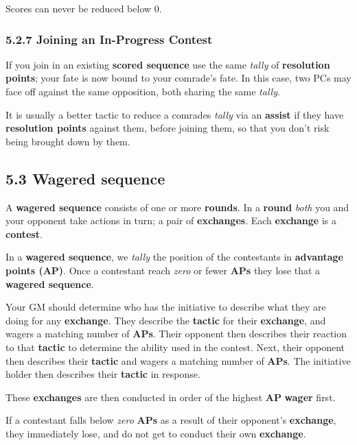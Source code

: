 \documentclass[
  11pt,
]{article}
\begin{document}
Scores can never be reduced below 0.

\hypertarget{joining-an-in-progress-contest-1}{%
\subsubsection{5.2.7 Joining an In-Progress
Contest}\label{joining-an-in-progress-contest-1}}

If you join in an existing \textbf{scored sequence} use the same
\emph{tally} of \textbf{resolution points}; your fate is now bound to
your comrade's fate. In this case, two PCs may face off against the same
opposition, both sharing the same \emph{tally}.

It is usually a better tactic to reduce a comrades \emph{tally} via an
\textbf{assist} if they have \textbf{resolution points} against them,
before joining them, so that you don't risk being brought down by them.

\hypertarget{wagered-sequence}{%
\subsection{5.3 Wagered sequence}\label{wagered-sequence}}

A \textbf{wagered sequence} consists of one or more \textbf{rounds}. In
a \textbf{round} \emph{both} you and your opponent take actions in turn;
a pair of \textbf{exchanges}. Each \textbf{exchange} is a
\textbf{contest}.

In a \textbf{wagered sequence}, we \emph{tally} the position of the
contestants in \textbf{advantage points (AP)}. Once a contestant reach
\emph{zero} or fewer \textbf{APs} they lose that a \textbf{wagered
sequence}.

Your GM should determine who has the initiative to describe what they
are doing for any \textbf{exchange}. They describe the \textbf{tactic}
for their \textbf{exchange}, and wagers a matching number of
\textbf{APs}. Their opponent then describes their reaction to that
\textbf{tactic} to determine the ability used in the contest. Next,
their opponent then describes their \textbf{tactic} and wagers a
matching number of \textbf{APs}. The initiative holder then describes
their \textbf{tactic} in response.

These \textbf{exchanges} are then conducted in order of the highest
\textbf{AP} \textbf{wager} first.

If a contestant falls below \emph{zero} \textbf{APs} as a result of
their opponent's \textbf{exchange}, they immediately lose, and do not
get to conduct their own \textbf{exchange}.
\end{document}

